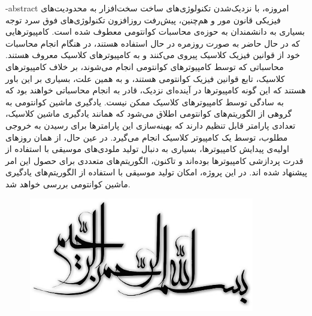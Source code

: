 \department{}

\fa-abstract{
امروزه، با نزدیک‌شدن تکنولوژی‌های ساخت سخت‌افزار به محدودیت‌های فیزیکی قانون مور
و هم‌چنین، پیش‌رفت روزافزون تکنولوژی‌های فوق سرد
توجه بسیاری به دانشمندان به حوزه‌ی محاسبات کوانتومی معطوف شده است. 
کامپیوترهایی که در حال حاضر به صورت روزمره در حال استفاده هستند، در هنگام انجام محاسبات خود از قوانین فیزیک کلاسیک پیروی می‌کنند و به کامپیوترهای کلاسیک معروف هستند.
محاسباتی که توسط کامپیوترهای کوانتومی انجام می‌شوند، بر خلاف کامپیوترهای کلاسیک، تابع قوانین فیزیک کوانتومی هستند، و به همین علت، بسیاری بر این باور هستند که این گونه کامپیوترها در آینده‌ای نزدیک، قادر به انجام محاسباتی خواهند بود که به سادگی توسط کامپیوترهای کلاسیک ممکن نیست.
یادگیری ماشین کوانتومی
به گروهی از الگوریتم‌های کوانتومی اطلاق می‌شود که همانند یادگیری ماشین کلاسیک، تعدادی پارامتر قابل تنظیم دارند که بهینه‌سازی این پارامترها برای رسیدن به خروجی مطلوب، توسط یک کامپیوتر کلاسیک انجام می‌گیرد.
در عین حال، از همان روزهای اولیه‌ی پیدایش کامپیوترها، بسیاری به دنبال تولید ملودی‌های موسیقی با استفاده از قدرت پردازشی کامپیوترها بوده‌اند و تاکنون، الگوریتم‌های متعددی برای حصول این امر پیشنهاد شده اند.
در این پروژه، امکان تولید موسیقی با استفاده از الگوریتم‌های یادگیری ماشین کوانتومی بررسی خواهد شد.
}





\AUTtitle
\vspace*{7cm}
\thispagestyle{empty}
\begin{center}
\includegraphics[height=5cm,width=12cm]{figures/besm.jpg}
\end{center}